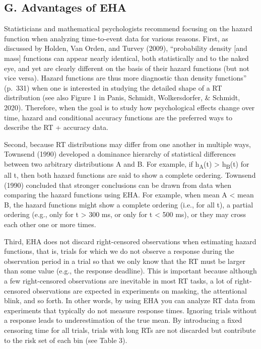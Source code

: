\documentclass[
  man,floatsintext]{apa6}
\begin{document}
\subsection{G. Advantages of EHA}\label{g.-advantages-of-eha}

Statisticians and mathematical psychologists recommend focusing on the hazard function when analyzing time-to-event data for various reasons. First, as discussed by Holden, Van Orden, and Turvey (2009), ``probability density {[}and mass{]} functions can appear nearly identical, both statistically and to the naked eye, and yet are clearly different on the basis of their hazard functions (but not vice versa). Hazard functions are thus more diagnostic than density functions'' (p.~331) when one is interested in studying the detailed shape of a RT distribution (see also Figure 1 in Panis, Schmidt, Wolkersdorfer, \& Schmidt, 2020). Therefore, when the goal is to study how psychological effects change over time, hazard and conditional accuracy functions are the preferred ways to describe the RT + accuracy data.

Second, because RT distributions may differ from one another in multiple ways, Townsend (1990) developed a dominance hierarchy of statistical differences between two arbitrary distributions A and B. For example, if h\textsubscript{A}(t) \textgreater{} h\textsubscript{B}(t) for all t, then both hazard functions are said to show a complete ordering. Townsend (1990) concluded that stronger conclusions can be drawn from data when comparing the hazard functions using EHA. For example, when mean A \textless{} mean B, the hazard functions might show a complete ordering (i.e., for all t), a partial ordering (e.g., only for t \textgreater{} 300 ms, or only for t \textless{} 500 ms), or they may cross each other one or more times.

Third, EHA does not discard right-censored observations when estimating hazard functions, that is, trials for which we do not observe a response during the observation period in a trial so that we only know that the RT must be larger than some value (e.g., the response deadline). This is important because although a few right-censored observations are inevitable in most RT tasks, a lot of right-censored observations are expected in experiments on masking, the attentional blink, and so forth. In other words, by using EHA you can analyze RT data from experiments that typically do not measure response times. Ignoring trials without a response leads to underestimation of the true mean. By introducing a fixed censoring time for all trials, trials with long RTs are not discarded but contribute to the risk set of each bin (see Table 3).
\end{document}
